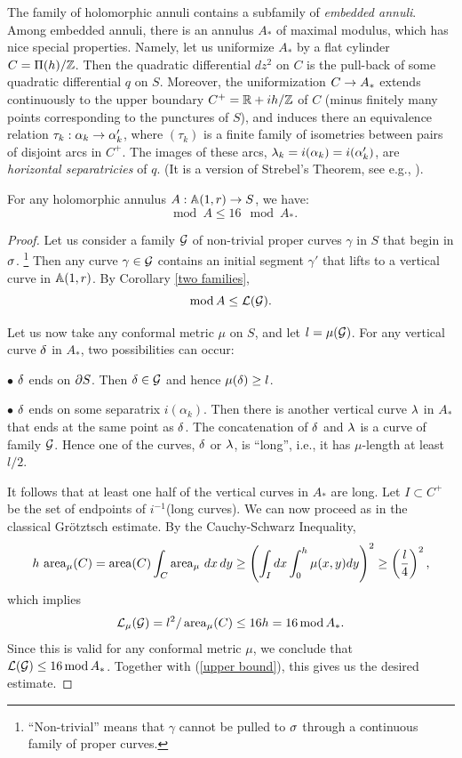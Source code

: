 The family of holomorphic annuli contains a subfamily of {\it embedded annuli}.
Among embedded annuli,  there is an  annulus $A_*$ of maximal modulus,
which has nice special properties. Namely, let us uniformize $A_*$ by a flat cylinder
$C= \Pi(h)/ {\Bbb Z}$. Then the quadratic differential $dz^2$ on $C$ is the pull-back of some
quadratic differential $q$ on $S$. Moreover, the uniformization $C\rightarrow A_*$ extends continuously
to the upper boundary $C^+= {\Bbb R}+ih /{\Bbb Z}$ of $C$ (minus finitely many points corresponding to the punctures
of $S$),
and induces there an equivalence relation
$\tau_k : \alpha_k \rightarrow \alpha_k'$, where $(\tau_k)$ is a finite family of  isometries between pairs of
disjoint arcs in $C^+$. The images of these arcs, ${\lambda}_k = i(\alpha_k)=i(\alpha_k')$,
are {\it horizontal separatricies} of $q$.
(It is a version of Strebel's Theorem, see e.g., \cite[\S 11]{GL}).

\begin{lem}\label{emb vs hol}
  For any holomorphic annulus $A: {\Bbb A}(1,r)\rightarrow S$, we have:
$$
   \mod A\leq 16 \mod A_*.
$$
\end{lem}

\begin{proof}
  Let us consider a family ${\mathcal G}$ of non-trivial proper curves $\gamma$ in $S$ that begin in  ${\sigma}$.%
\footnote{``Non-trivial'' means that $\gamma$ cannot be pulled to ${\sigma}$ through a continuous
family of proper curves.} Then  any curve $\gamma\in {\mathcal G}$ contains an initial segment $\gamma'$
that lifts to a vertical curve in ${\Bbb A}(1,r)$. By Corollary \ref{two families},
\begin{equation}\label{upper bound}
  \operatorname{mod} A\leq {\mathcal L}({\mathcal G}).
\end{equation}

Let us now take any conformal metric $\mu$ on $S$, and let $l= \mu({\mathcal G})$.
For any vertical curve ${\delta}$ in $A_*$, two possibilities can occur:

\ssk\nin $\bullet$ ${\delta}$ ends on $\partial S$. Then ${\delta} \in {\mathcal G}$ and hence $\mu({\delta})\geq l$.

\ssk\nin $\bullet$  ${\delta}$ ends on some separatrix $i(\alpha_k)$.
Then there is another vertical curve ${\lambda}$
in $A_*$ that ends at the same point as ${\delta}$.
The concatenation of ${\delta}$ and ${\lambda}$ is a curve of family ${\mathcal G}$.
Hence one of the curves, ${\delta}$ or ${\lambda}$, is ``long'',
i.e., it has $\mu$-length at least $l/2$.
\ssk

It follows that at least one half of the vertical curves in $A_*$ are long.
Let $I\subset C^+$ be the set of endpoints of $i^{-1}$(long curves).
We can now proceed as in the classical Gr\"otztsch estimate.
By the Cauchy-Schwarz Inequality,
$$
 h\, \operatorname{area}_\mu(C) = \operatorname{area}(C) \int_C \operatorname{area}_\mu\, dx\, dy   \geq  \left( \int_I dx \int_{0}^h \mu(x,y) dy\right)^2
  \geq \left( \frac{l}{4} \right)^2,
$$
which implies
$$
  {\mathcal L}_\mu({\mathcal G})=l^2/\operatorname{area}_\mu(C) \leq 16 h = 16 \operatorname{mod} A_*.
$$
Since this is valid for any conformal metric $\mu$, we conclude that ${\mathcal L}({\mathcal G})\leq 16\operatorname{mod} A_*$.
Together with (\ref{upper bound}), this gives us the desired estimate.
\end{proof}
